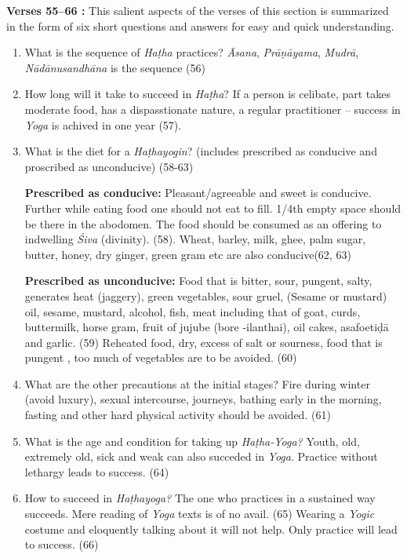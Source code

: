 \textbf{Verses 55--66 :} This salient aspects of the verses of this section is summarized in the form of six short questions and answers for easy and quick understanding.

\begin{enumerate}
\item What is the sequence of \textit{Haṭha} practices?  \textit{Āsana}, \textit{Prāṇāyama}, \textit{Mudrā}, \textit{Nādānusandhāna} is the sequence (56)
\item How long will it take to succeed in \textit{Haṭha}? If a person is celibate, part takes moderate food, has a dispasstionate nature, a regular practitioner – success in \textit{Yoga} is achived in one year (57).
\item What is the diet for a \textit{Haṭhayogin}? (includes prescribed as conducive and proscribed as unconducive) (58-63)   

\textbf{Prescribed as conducive:} Pleasant/agreeable and sweet is conducive. Further while eating food  one should not eat to fill. 1/4th  empty space should be there in the abodomen. The food should be consumed as an offering to indwelling \textit{Śiva} (divinity). (58). Wheat, barley, milk, ghee, palm sugar, butter, honey, dry ginger, green gram etc  are also conducive(62, 63)

\textbf{Prescribed as unconducive:} Food that is bitter, sour, pungent, salty, generates heat (jaggery), green vegetables, sour gruel, (Sesame or mustard) oil, sesame, mustard, alcohol, fish, meat including that of goat, curds, buttermilk, horse gram, fruit of jujube (bore -ilanthai), oil cakes, asafoetiḍā and garlic. (59) Reheated food, dry, excess of salt or sourness, food that is pungent , too much of vegetables are to be avoided. (60)
\item What are the other precautions at the initial stages?    Fire during winter (avoid luxury), sexual intercourse, journeys, bathing early in the morning, fasting and other hard physical activity should be avoided. (61)  
\item What is the age and condition for taking up \textit{Haṭha-Yoga?} Youth, old, extremely old, sick and weak can also succeded in \textit{Yoga}. Practice without lethargy leads to success. (64)
\item How to succeed in \textit{Haṭhayoga?} The one who practices in a sustained way succeeds. Mere reading of \textit{Yoga} texts is of no avail. (65) Wearing a \textit{Yogic} costume and eloquently talking about it will not help. Only practice will lead to success. (66) 
\end{enumerate}

